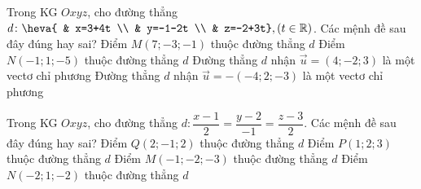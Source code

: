 \begin{ex}%
	Trong KG $Oxyz$, cho đường thẳng $d\colon \heva{
		& x=3+4t \\ 
		& y=-1-2t \\ 
		& z=-2+3t},( t\in \mathbb{R})$. Các mệnh đề sau đây đúng hay sai?
	\choiceTF
	{ Điểm $M\left( 7;-3;-1 \right)$ thuộc đường thẳng $d$}
	{ \True Điểm $N\left( -1;1;-5 \right)$ thuộc đường thẳng $d$}
	{\True  Đường thẳng $d$ nhận $\overrightarrow{u}=\left( 4;-2;3 \right)$ là một vectơ chỉ phương}
	{\True  Đường thẳng $d$ nhận $\overrightarrow{u}=-\left( -4;2;-3 \right)$ là một vectơ chỉ phương}
\end{ex}
\begin{ex}%
	Trong KG $Oxyz$, cho đường thẳng $d \colon \dfrac{x-1}{2}=\dfrac{y-2}{-1}=\dfrac{z-3}{2}$. Các mệnh đề sau đây đúng hay sai?
	\choiceTF
	{ Điểm $Q\left( 2;-1;2 \right)$ thuộc đường thẳng $d$}
	{ \True Điểm $P\left( 1;2;3 \right)$ thuộc đường thẳng $d$}
	{ Điểm $M\left( -1;-2;-3 \right)$ thuộc đường thẳng $d$}
	{ Điểm $N\left( -2;1;-2 \right)$ thuộc đường thẳng $d$}
\end{ex}

